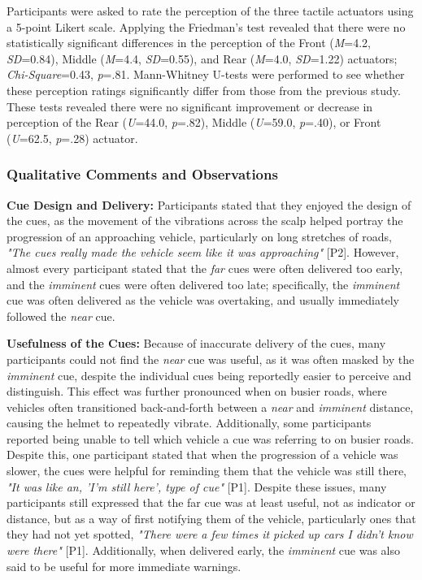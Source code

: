 \documentclass{mpaper}
\begin{document}
Participants were asked to rate the perception of the three tactile actuators using a 5-point Likert scale. Applying the Friedman’s test revealed that there were no statistically significant differences in the perception of the Front (\textit{M}=4.2, \textit{SD}=0.84), Middle (\textit{M}=4.4, \textit{SD}=0.55), and Rear (\textit{M}=4.0, \textit{SD}=1.22) actuators; \textit{Chi-Square}=0.43, \textit{p}=.81. Mann-Whitney U-tests were performed to see whether these perception ratings significantly differ from those from the previous study. These tests revealed there were no significant improvement or decrease in perception of the Rear (\textit{U}=44.0, \textit{p}=.82), Middle (\textit{U}=59.0, \textit{p}=.40), or Front (\textit{U}=62.5, \textit{p}=.28) actuator.

\subsubsection{Qualitative Comments and Observations}
\textbf{Cue Design and Delivery:} Participants stated that they enjoyed the design of the cues, as the movement of the vibrations across the scalp helped portray the progression of an approaching vehicle, particularly on long stretches of roads, \textit{"The cues really made the vehicle seem like it was approaching"} [P2]. However, almost every participant stated that the \textit{far} cues were often delivered too early, and the \textit{imminent} cues were often delivered too late; specifically, the \textit{imminent} cue was often delivered as the vehicle was overtaking, and usually immediately followed the \textit{near} cue. 

\textbf{Usefulness of the Cues:} Because of inaccurate delivery of the cues, many participants could not find the \textit{near} cue was useful, as it was often masked by the \textit{imminent} cue, despite the individual cues being reportedly easier to perceive and distinguish. This effect was further pronounced when on busier roads, where vehicles often transitioned back-and-forth between a \textit{near} and \textit{imminent} distance, causing the helmet to repeatedly vibrate. Additionally, some participants reported being unable to tell which vehicle a cue was referring to on busier roads. Despite this, one participant stated that when the progression of a vehicle was slower, the cues were helpful for reminding them that the vehicle was still there, \textit{"It was like an, 'I'm still here', type of cue" }[P1]. Despite these issues, many participants still expressed that the far cue was at least useful, not as indicator or distance, but as a way of first notifying them of the vehicle, particularly ones that they had not yet spotted, \textit{"There were a few times it picked up cars I didn't know were there"} [P1]. Additionally, when delivered early, the \textit{imminent} cue was also said to be useful for more immediate warnings.
\end{document}

